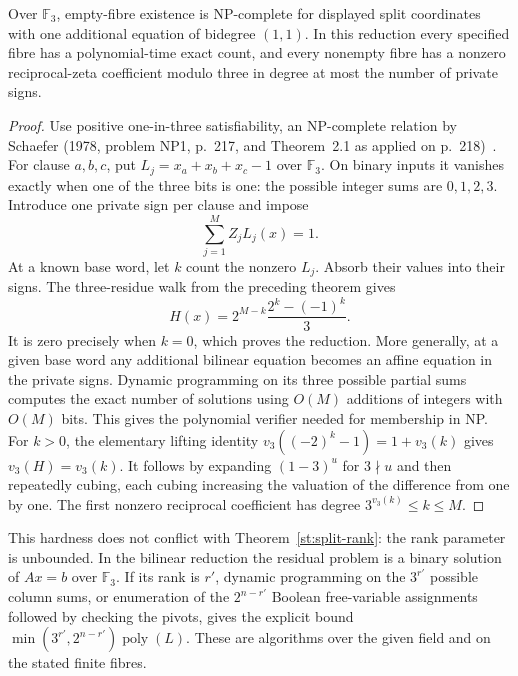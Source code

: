 \begin{proposition}
\label{st:bilinear-hard}
Over $\mathbb F_3$, empty-fibre existence is NP-complete for displayed split coordinates with one additional equation of bidegree $(1,1)$. In this reduction every specified fibre has a polynomial-time exact count, and every nonempty fibre has a nonzero reciprocal-zeta coefficient modulo three in degree at most the number of private signs.
\end{proposition}
\begin{proof}
Use positive one-in-three satisfiability, an NP-complete relation by Schaefer (1978, problem NP1, p.~217, and Theorem~2.1 as applied on p.~218)~\cite{st-schaefer}. For clause $a,b,c$, put $L_j=x_a+x_b+x_c-1$ over $\mathbb F_3$. On binary inputs it vanishes exactly when one of the three bits is one: the possible integer sums are $0,1,2,3$. Introduce one private sign per clause and impose
\[
 \sum_{j=1}^{M}Z_jL_j(x)=1.
\]
At a known base word, let $k$ count the nonzero $L_j$. Absorb their values into their signs. The three-residue walk from the preceding theorem gives
\[
 H(x)=2^{M-k}\frac{2^k-(-1)^k}{3}.
\]
It is zero precisely when $k=0$, which proves the reduction. More generally, at a given base word any additional bilinear equation becomes an affine equation in the private signs. Dynamic programming on its three possible partial sums computes the exact number of solutions using $O(M)$ additions of integers with $O(M)$ bits. This gives the polynomial verifier needed for membership in NP. For $k>0$, the elementary lifting identity
$v_3((-2)^k-1)=1+v_3(k)$ gives $v_3(H)=v_3(k)$. It follows by expanding $(1-3)^u$ for $3\nmid u$ and then repeatedly cubing, each cubing increasing the valuation of the difference from one by one. The first nonzero reciprocal coefficient has degree $3^{v_3(k)}\le k\le M$.
\end{proof}
This hardness does not conflict with Theorem~\ref{st:split-rank}: the rank parameter is unbounded. In the bilinear reduction the residual problem is a binary solution of $Ax=b$ over $\mathbb F_3$. If its rank is $r'$, dynamic programming on the $3^{r'}$ possible column sums, or enumeration of the $2^{n-r'}$ Boolean free-variable assignments followed by checking the pivots, gives the explicit bound $\min(3^{r'},2^{n-r'})\operatorname{poly}(L)$. These are algorithms over the given field and on the stated finite fibres.
